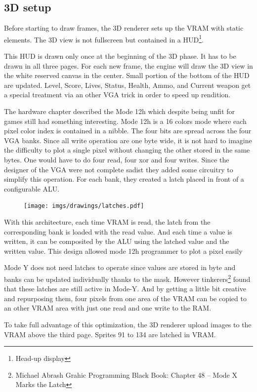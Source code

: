 \subsection{3D setup}
Before starting to draw frames, the 3D renderer sets up the VRAM with static elements. The 3D view is not fullscreen but contained in a HUD\footnote{Head-up display}.
\begin{figure}[H]
  \centering
\end{figure}
This HUD is drawn only once at the beginning of the 3D phase. It has to be drawn in all three pages. For each new frame, the engine will draw the 3D view in the white reserved canvas in the center. Small portion of the bottom of the HUD are updated. Level, Score, Lives, Status, Health, Ammo, and Current weapon get a special treatment via an other VGA trick in order to speed up rendition.\\
\par

The hardware chapter described the Mode 12h which despite being unfit for games still had something interesting. Mode 12h is a 16 colors mode where each pixel color index is contained in a nibble. The four bits are spread across the four VGA banks. Since all write operation are one byte wide, it is not hard to imagine the difficulty to plot a single pixel without changing the other stored in the same bytes. One would have to do four read, four xor and four writes. Since the designer of the VGA were not complete sadist they added some circuitry to simplify this operation. For each bank, they created a latch placed in front of a configurable ALU.\\
\par
 \begin{figure}[H]
\centering
 \texttt{[image: imgs/drawings/latches.pdf]}
 \end{figure}
With this architecture, each time VRAM is read, the latch from the corresponding bank is loaded with the read value. And each time a value is written, it can be composited by the ALU using the latched value and the written value. This design allowed mode 12h programmer to plot a pixel easily\\
\par
Mode Y does not need latches to operate since values are stored in byte and banks can be updated individually thanks to the mask. However tinkerers\footnote{Michael Abrash Grahic Programming Black Book: Chapter 48 -- Mode X Marks the Latch} found that these latches are still active in  Mode-Y. And by getting a little bit creative and repurposing them, four pixels from one area of the VRAM can be copied to an other VRAM area with just one read and one write to the RAM.\\
\par
To take full advantage of this optimization, the 3D renderer upload images to the VRAM above the third page. Sprites 91 to 134 are latched in VRAM.\\

